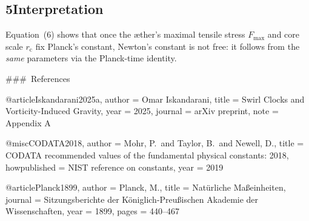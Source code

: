 \documentclass[11pt]{article}
\begin{document}
\subsection*{5\quad Interpretation}

Equation~(6) shows that once the æther’s maximal tensile stress $F_{\max}$ and core scale $r_{\mathrm{c}}$ fix Planck’s constant, Newton’s constant is not free: it follows from the \textit{same} parameters via the Planck-time identity.


\bigskip



### References


@article{Iskandarani2025a,
  author  = {Omar Iskandarani},
  title   = {Swirl Clocks and Vorticity-Induced Gravity},
  year    = {2025},
  journal = {arXiv preprint},
  note    = {Appendix A}
}

@misc{CODATA2018,
  author       = {Mohr, P.~and Taylor, B.~and Newell, D.},
  title        = {CODATA recommended values of the fundamental physical constants: 2018},
  howpublished = {NIST reference on constants},
  year         = {2019}
}

@article{Planck1899,
  author  = {Planck, M.},
  title   = {Natürliche Maßeinheiten},
  journal = {Sitzungsberichte der Königlich-Preußischen Akademie der Wissenschaften},
  year    = {1899},
  pages   = {440--467}
}
\end{document}
